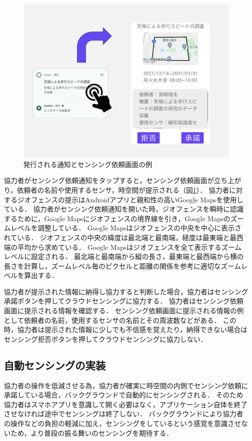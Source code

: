 \begin{figure}[tbh]
    \centering
    \includegraphics[width=16cm]{img_notify.png}
    \caption{発行される通知とセンシング依頼画面の例}
    \label{fig:notify}
\end{figure}

協力者がセンシング依頼通知をタップすると，センシング依頼画面が立ち上がり，依頼者の名前や使用するセンサ，時空間が提示される（図\ref{fig:notify}）．
協力者に対するジオフェンスの提示はAndroidアプリと親和性の高いGoogle Mapsを使用している．
協力者がセンシング依頼通知を開いた時，ジオフェンスを瞬時に認識するために，Google Mapsにジオフェンスの境界線を引き，Google Mapsのズームレベルを調整している．
Google Mapsはジオフェンスの中央を中心に表示されている．
ジオフェンスの中央の緯度は最北端と最南端，経度は最東端と最西端の平均から求めている．
Google Mapsはジオフェンスを全て表示するズームレベルに設定される．
最北端と最南端から縦の長さ，最東端と最西端から横の長さを計算し，ズームレベル毎のピクセルと距離の関係\cite{GoogleMap}を参考に適切なズームレベルを算出する．

協力者が提示された情報に納得し協力すると判断した場合，協力者はセンシング承諾ボタンを押してクラウドセンシングに協力する．
協力者はセンシング依頼画面に提示される情報を確認する．
センシング依頼画面に提示される情報の例として依頼者の名前，使用するセンサの名前とその周波数などがある．
この時，協力者は提示された情報に少しでも不信感を覚えたり，納得できない場合はセンシング拒否ボタンを押してクラウドセンシングに協力しない．

\subsection{自動センシングの実装}
\label{myApp_sensing}
協力者の操作を低減させる為，協力者が確実に時空間の内側でセンシング依頼に承諾している場合，バックグラウンドで自動的にセンシングされる．
そのため協力者はスマホアプリを意識して開く必要はなく，アプリケーション自体を終了させなければ途中でセンシングは終了しない．
バックグラウンドにより協力者の操作などの負担の軽減に加え，センシングをしているという感覚を意識させないため，より普段の振る舞いのセンシングを期待する．

